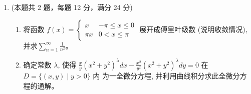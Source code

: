 \begin{enumerate}
\begin{enumerate}
	
	
	
\end{enumerate}



\banswer{
	\begin{enumerate}
		\item
		$ V= \frac{ 5 }{ 6 } \pi a^{3} $
		\item 
		$\sum\limits_{n=1}^{\infty}\left[n(n+1)-\frac{1}{n(n+1)}\right] x^{n}=
		\left\{
		\begin{aligned}
			&0&(x=0)\\
			&\frac{2x}{(1-x)^{3}}-(1-x)\frac{\ln (1-x)}{x} -1 & (-1<x<1)
		\end{aligned}\right.
		$	
		\item 
		$ (-\infty, 0] \cup \{ \frac{2\sqrt{3}}{9} \} $
	\end{enumerate}
	
	
}


\newpage
\item 
(本题共 2 题，每题 12 分，满分 24 分)
\begin{enumerate}
	\item
	将函数 $f(x)=\left\{\begin{array}{lc}x & -\pi \leqslant x \leqslant 0 \\ \pi x & 0<x \leqslant \pi\end{array}\right.$ 展开成傅里叶级数 (说明收敛情况), 并求$\sum\limits_{n=1}^{\infty} \frac{1}{n^{2}}$。
	
	
	\item 
确定常数 $\lambda$, 使得 $\frac{x}{y}\left(x^{2}+y^{2}\right)^{\lambda} d x-\frac{x^{2}}{y^{2}}\left(x^{2}+y^{2}\right)^{\lambda} d y=0$ 在 $D=\{(x, y) \mid y>0\}$ 内 为一全微分方程, 并利用曲线积分求此全微分方程的通解。
	
	
\end{enumerate}


\end{enumerate}

